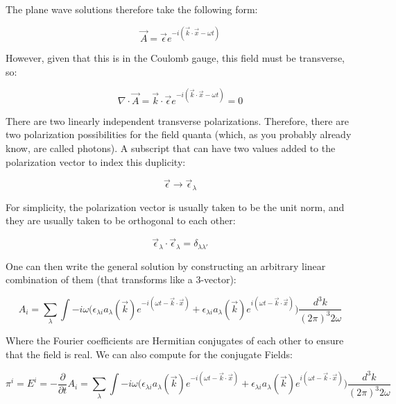 \documentclass[a4]{article}
\begin{document}
    The plane wave solutions therefore take the following form:

    \begin{equation}
        \vec{A} = \vec{\epsilon} e^{-i (\vec{k} \cdot \vec{x} - \omega t)}
    \end{equation}

    However, given that this is in the Coulomb gauge, this field must be transverse, so:

    \begin{equation}
        \nabla \cdot \vec{A} = \vec{k} \cdot \vec{\epsilon} e^{-i (\vec{k} \cdot \vec{x} - \omega t)} = 0
    \end{equation}

    There are two linearly independent transverse polarizations. Therefore, there are two polarization possibilities
    for the field quanta (which, as you probably already know, are called photons). A subscript that can have two
    values added to the polarization vector to index this duplicity:

    \begin{equation}
        \vec{\epsilon} \rightarrow \vec{\epsilon}_{\lambda}
    \end{equation}

    For simplicity, the polarization vector is usually taken to be the unit norm, and they are usually taken to be
    orthogonal to each other:

    \begin{equation}
        \vec{\epsilon}_{\lambda} \cdot \vec{\epsilon}_{\lambda} = \delta_{\lambda \lambda'}
    \end{equation}

    One can then write the general solution by constructing an arbitrary linear combination of them (that transforms like
    a 3-vector):

    \begin{equation}
        A_{i} = \sum_{\lambda} \int - i \omega \bigg( \epsilon_{\lambda i} a_{\lambda} (\vec{k}) e^{- i (\omega t - \vec{k} \cdot \vec{x})} + \epsilon_{\lambda i} a_{\lambda} (\vec{k}) e^{i (\omega t - \vec{k} \cdot \vec{x})} \bigg) \frac{d^{3} k}{(2 \pi)^{3} 2 \omega}
    \end{equation}

    Where the Fourier coefficients are Hermitian conjugates of each other to ensure that the field is real. We can also
    compute for the conjugate Fields:

    \begin{equation}
        \pi^{i} = E^{i} = - \frac{\partial}{\partial t} A_{i} = \sum_{\lambda} \int - i \omega \bigg( \epsilon_{\lambda i} a_{\lambda} (\vec{k}) e^{- i (\omega t - \vec{k} \cdot \vec{x})} + \epsilon_{\lambda i} a_{\lambda} (\vec{k}) e^{i (\omega t - \vec{k} \cdot \vec{x})} \bigg) \frac{d^{3} k}{(2 \pi)^{3} 2 \omega}
    \end{equation}
\end{document}
